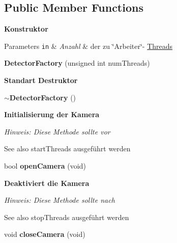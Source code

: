 \subsection*{Public Member Functions}
\begin{Indent}{\bf Konstruktor}\par
{\em 
\begin{DoxyParams}[1]{Parameters}
\mbox{\tt in}  & {\em Anzahl} & der zu \char`\"{}\+Arbeiter\char`\"{}-\/ \hyperlink{classrc_1_1Threads}{Threads} \\
\hline
\end{DoxyParams}
}\begin{DoxyCompactItemize}
\item 
\hypertarget{classrc_1_1DetectorFactory_ad72f65512a7defe3030f827cf2325714}{{\bfseries Detector\+Factory} (unsigned int num\+Threads)}\label{classrc_1_1DetectorFactory_ad72f65512a7defe3030f827cf2325714}

\end{DoxyCompactItemize}
\end{Indent}
\begin{Indent}{\bf Standart Destruktor}\par
\begin{DoxyCompactItemize}
\item 
\hypertarget{classrc_1_1DetectorFactory_a376b02d1b04b7a310a4c14e8bcd84abb}{{\bfseries $\sim$\+Detector\+Factory} ()}\label{classrc_1_1DetectorFactory_a376b02d1b04b7a310a4c14e8bcd84abb}

\end{DoxyCompactItemize}
\end{Indent}
\begin{Indent}{\bf Initialisierung der Kamera}\par
{\em Hinweis\+: Diese Methode sollte {\itshape vor}

\begin{DoxySeeAlso}{See also}
start\+Threads ausgeführt werden 
\end{DoxySeeAlso}
}\begin{DoxyCompactItemize}
\item 
\hypertarget{classrc_1_1DetectorFactory_a1d8b3b87e6a62e4f1f4bbbd2efdef8d6}{bool {\bfseries open\+Camera} (void)}\label{classrc_1_1DetectorFactory_a1d8b3b87e6a62e4f1f4bbbd2efdef8d6}

\end{DoxyCompactItemize}
\end{Indent}
\begin{Indent}{\bf Deaktiviert die Kamera}\par
{\em Hinweis\+: Diese Methode sollte {\itshape nach}

\begin{DoxySeeAlso}{See also}
stop\+Threads ausgeführt werden 
\end{DoxySeeAlso}
}\begin{DoxyCompactItemize}
\item 
\hypertarget{classrc_1_1DetectorFactory_a17f9fa472057829330763e28d6066c4c}{void {\bfseries close\+Camera} (void)}\label{classrc_1_1DetectorFactory_a17f9fa472057829330763e28d6066c4c}

\end{DoxyCompactItemize}
\end{Indent}
